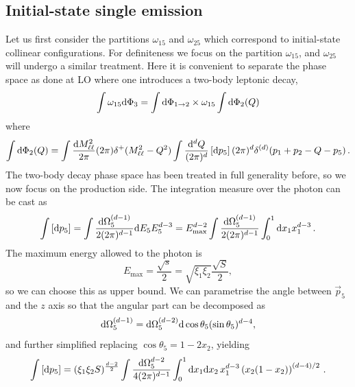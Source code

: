 \documentclass[a4paper,11pt]{article}
\begin{document}
\subsection{Initial-state single emission}
\label{se:ISNLO}
Let us first consider the partitions $\omega_{15}$ and $\omega_{25}$
which correspond to initial-state collinear configurations.
For definiteness we focus on the partition $\omega_{15}$, 
and $\omega_{25}$ will undergo a similar treatment.
Here it is convenient to separate the phase space as done at LO where 
one introduces a two-body leptonic decay, \ie
\begin{equation}
\int \omega_{15} \mathrm d\Phi_3 = 
\int \mathrm d\Phi_{1\to2} \times \omega_{15} \int \mathrm d \Phi_{2}(Q)
\end{equation}
where
\begin{align}
\int \mathrm d \Phi_{2}(Q) = 
\int \frac{\mathrm d M^2_{\ell\ell}}{2\pi} (2\pi)\delta^+(M^2_{\ell\ell}-Q^2)
\int\frac{\mathrm d^d Q}{(2\pi)^d} 
\left[ \mathrm d p_5\right]
(2\pi)^d\delta^{(d)}(p_1 + p_2 -Q-p_5)\, .
\end{align}
The two-body decay phase space has been treated in full generality before,
so we now focus on the production side.
The integration measure over the photon can be cast as
\begin{equation}
\int \left[ \mathrm d p_5\right] =
\int \frac{\mathrm d \Omega^{(d-1)}_5}{2(2\pi)^{d-1}} \mathrm d E_5 E^{d-3}_5 = 
E^{d-2}_{\max} \int\frac{\mathrm d \Omega^{(d-1)}_5}{2(2\pi)^{d-1}} \int^1_0\mathrm d x_1 x_1^{d-3}\,.
\end{equation}
The maximum energy allowed to the photon is
\begin{equation}
E_{\max} = \frac{\sqrt{s}}{2} = \sqrt{\xi_1 \xi_2}\frac{\sqrt{S}}{2},
\end{equation}
so we can choose this as upper bound.
We can parametrise the angle between $\vec{p}_5$ and the $z$ axis so that 
the angular part can be decomposed as
\begin{equation}
\mathrm d \Omega^{(d-1)}_5 = \mathrm d \Omega^{(d-2)}_5 \mathrm d\cos\theta_5 (\sin\theta_5)^{d-4},
\end{equation}
and further simplified replacing $\cos \theta_5 = 1 - 2 x_2$, yielding
\begin{equation}
\int\left[\mathrm d p_5\right] = 
(\xi_1 \xi_2 S)^{\frac{d-2}{2}}
\int \frac{\mathrm d\Omega^{d-2}_5}{4(2\pi)^{d-1}}
\int^1_0 \mathrm d x_1 \mathrm d x_2 \, x_1^{d-3} \left(x_2(1-x_2)\right)^{(d-4)/2}\, .
\end{equation}
\end{document}
